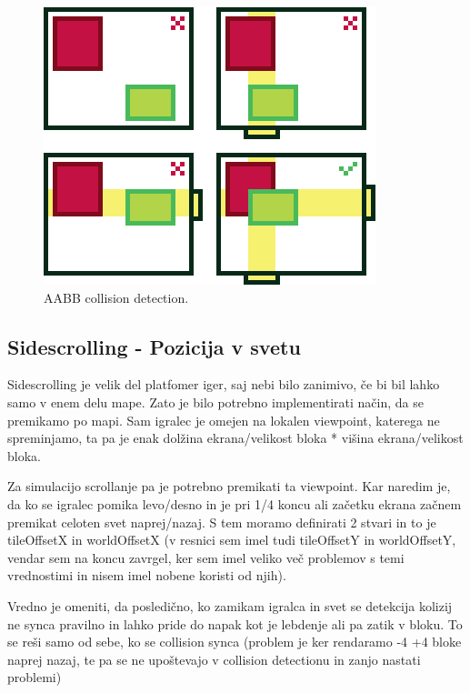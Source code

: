 \documentclass[a4paper,11pt]{article}
\begin{document}
\begin{figure}[htbp]
	\begin{center}
		\includegraphics[scale=0.6]{overlap.png}
		\caption{AABB collision detection.}
		\label{zanri_slika}
	\end{center}
\end{figure}
\pagebreak

\subsection{Sidescrolling - Pozicija v svetu}

Sidescrolling je velik del platfomer iger, saj nebi bilo zanimivo, če bi bil lahko samo v enem delu mape. Zato je bilo potrebno implementirati način, da se premikamo po mapi. Sam igralec je omejen na lokalen viewpoint, katerega ne spreminjamo, ta pa je enak dolžina ekrana/velikost bloka * višina ekrana/velikost bloka.

Za simulacijo scrollanje pa je potrebno premikati ta viewpoint. Kar naredim je, da ko se igralec pomika levo/desno in je pri 1/4 koncu ali začetku ekrana začnem premikat celoten svet naprej/nazaj. S tem moramo definirati 2 stvari in to je tileOffsetX in worldOffsetX (v resnici sem imel tudi tileOffsetY in worldOffsetY, vendar sem na koncu zavrgel, ker sem imel veliko več problemov s temi vrednostimi in nisem imel nobene koristi od njih).

Vredno je omeniti, da posledično, ko zamikam igralca in svet se detekcija kolizij ne synca pravilno in lahko pride do napak kot je lebdenje ali pa zatik v bloku. To se reši samo od sebe, ko se collision synca (problem je ker rendaramo -4 +4 bloke naprej nazaj, te pa se ne upoštevajo v collision detectionu in zanjo nastati problemi)
\end{document}
